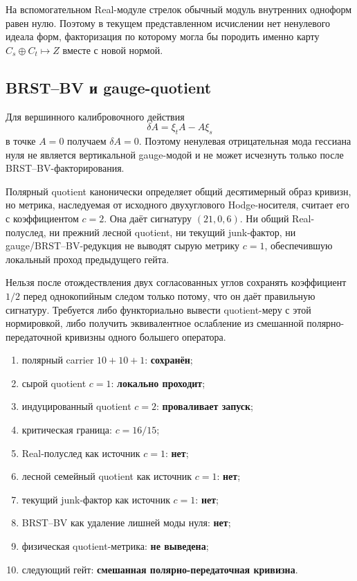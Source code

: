 На вспомогательном Real-модуле стрелок обычный модуль внутренних одноформ
равен нулю. Поэтому в текущем представленном исчислении нет ненулевого
идеала форм, факторизация по которому могла бы породить именно карту
$C_s\oplus C_t\mapsto Z$ вместе с новой нормой.

\subsection{BRST--BV и gauge-quotient}

Для вершинного калибровочного действия
\begin{equation}
 \delta A=\xi_tA-A\xi_s
 \label{eq:v7-reduced-gauge-variation}
\end{equation}
в точке $A=0$ получаем $\delta A=0$. Поэтому ненулевая отрицательная мода
гессиана нуля не является вертикальной gauge-модой и не может исчезнуть
только после BRST--BV-факторирования.

\begin{theorem}
Полярный quotient канонически определяет общий десятимерный образ
кривизн, но метрика, наследуемая от исходного двухуглового Hodge-носителя,
считает его с коэффициентом $c=2$. Она даёт сигнатуру $(21,0,6)$.
Ни общий Real-полуслед, ни прежний лесной quotient, ни текущий junk-фактор,
ни gauge/BRST--BV-редукция не выводят сырую метрику $c=1$, обеспечившую
локальный проход предыдущего гейта.
\end{theorem}

\begin{nogocriterion}
Нельзя после отождествления двух согласованных углов сохранять коэффициент
$1/2$ перед однокопийным следом только потому, что он даёт правильную
сигнатуру. Требуется либо функториально вывести quotient-меру с этой
нормировкой, либо получить эквивалентное ослабление из смешанной
полярно-передаточной кривизны одного большего оператора.
\end{nogocriterion}

\begin{protocol}
\begin{enumerate}
 \item полярный carrier $10+10+1$: \textbf{сохранён};
 \item сырой quotient $c=1$: \textbf{локально проходит};
 \item индуцированный quotient $c=2$: \textbf{проваливает запуск};
 \item критическая граница: \textbf{$c=16/15$};
 \item Real-полуслед как источник $c=1$: \textbf{нет};
 \item лесной семейный quotient как источник $c=1$: \textbf{нет};
 \item текущий junk-фактор как источник $c=1$: \textbf{нет};
 \item BRST--BV как удаление лишней моды нуля: \textbf{нет};
 \item физическая quotient-метрика: \textbf{не выведена};
 \item следующий гейт: \textbf{смешанная полярно-передаточная кривизна}.
\end{enumerate}
\end{protocol}

